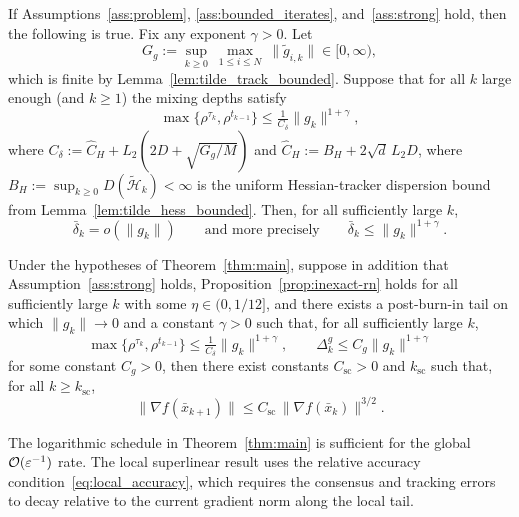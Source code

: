 \documentclass[review,onefignum,onetabnum]{siamart171218}
\begin{document}
	\begin{lemma}\label{lem:delta_o_g}
		If Assumptions~\ref{ass:problem}, \ref{ass:bounded_iterates},
		and~\ref{ass:strong} hold, then the following is true.
		Fix any exponent $\gamma>0$.
		Let
		\[
		G_g:=\sup_{k\ge 0}\ \max_{1\le i\le N}\ \|\tilde g_{i,k}\|\in[0,\infty),
		\]
		which is finite by Lemma~\ref{lem:tilde_track_bounded}.
		Suppose that for all $k$ large enough (and $k\ge 1$) the mixing depths satisfy
		\begin{equation}\label{eq:delta_schedule}
			\max\{\rho^{\tau_k},\rho^{t_{k-1}}\}\le \tfrac{1}{C_\delta}\|g_k\|^{1+\gamma},
		\end{equation}
		where $C_\delta:=\hat C_H+L_2(2D+\sqrt{G_g/M})$ and $\hat C_H:=B_H+2\sqrt{d}\,L_2D$,
		where $B_H:=\sup_{k\ge0}D(\tilde{\mathcal H}_k)<\infty$
		is the uniform Hessian-tracker dispersion bound from Lemma~\ref{lem:tilde_hess_bounded}.
		Then, for all sufficiently large $k$,
		\[
		\bar\delta_k = o(\|g_k\|)\qquad\text{and more precisely}\qquad \bar\delta_k\le \|g_k\|^{1+\gamma}.
		\]
	\end{lemma}
	
	\begin{theorem}\label{thm:superlinear}
		Under the hypotheses of Theorem~\ref{thm:main}, suppose in addition
		that Assumption~\ref{ass:strong} holds,
		Proposition~\ref{prop:inexact-rn} holds for all sufficiently large $k$ with some $\eta\in(0,1/12]$,
		and there exists a post-burn-in tail on which $\|g_k\|\to0$ and
		a constant $\gamma>0$ such that, for all sufficiently large $k$,
		\begin{equation}\label{eq:local_accuracy}
			\max\{\rho^{\tau_k},\rho^{t_{k-1}}\}\le
			\tfrac{1}{C_\delta}\|g_k\|^{1+\gamma},
			\qquad
			\Delta_k^g\le C_g\|g_k\|^{1+\gamma}
		\end{equation}
		for some constant $C_g>0$,
		then there exist constants $C_{\mathrm{sc}}>0$ and $k_{\mathrm{sc}}$ such that, for all $k\ge k_{\mathrm{sc}}$,
		\[
		\|\nabla f(\bar x_{k+1})\|\le C_{\mathrm{sc}}\,\|\nabla f(\bar x_k)\|^{3/2}.
		\]
	\end{theorem}
	
	\begin{remark}
		The logarithmic schedule in Theorem~\ref{thm:main} is sufficient for
		the global $\mathcal{O}(\varepsilon^{-1})$ rate. The local superlinear result
		uses the relative accuracy condition~\eqref{eq:local_accuracy}, which
		requires the consensus and tracking errors to decay relative to the
		current gradient norm along the local tail.
	\end{remark}
	
\end{document}
